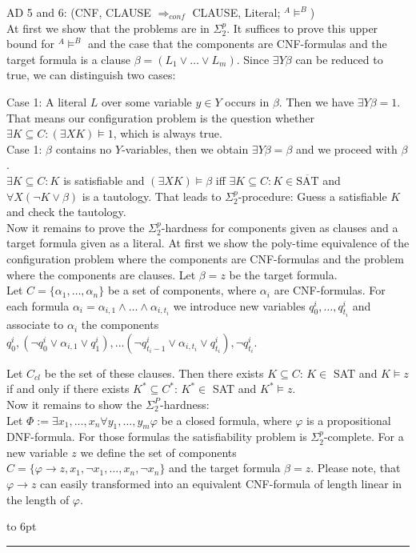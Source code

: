 \documentclass[12pt]{article}
\newcommand{\AMB}{\mbox{$^A$\hspace{-0.5mm}$\models^B$}}
\newenvironment{proof}{\parindent=0pt{\bf Proof: }}{
   \hspace*{\fill}\hbox to 6pt{\leaders\hrule width 6pt height 6pt\hfill}\par}
\begin{document}
\begin{proof}
AD 5 and 6: (CNF, CLAUSE $\Longrightarrow_{conf}$ CLAUSE, Literal; \AMB)\\
At first we show that the problems are in $\Sigma^p_2$. It suffices to prove this upper bound for \AMB
and the case that the components are CNF-formulas and the target formula is a clause
$\beta =(L_1 \vee \ldots \vee L_m)$. Since $\exists Y \beta$ can be reduced to true, we can distinguish two cases:

Case 1: A literal $L$ over some variable $y \in Y$ occurs in $\beta$. Then we have $\exists Y \beta = 1$. That means our configuration problem is the question whether
$\exists K \subseteq C: (\exists X K) \models 1$, which is always true.\\

Case 1: $\beta$ contains no $Y$-variables, then we obtain $\exists Y \beta = \beta$ and we proceed with $\beta$.\\
$\exists K \subseteq C: K$ is satisfiable and $(\exists X K) \models \beta$ iff
$\exists K \subseteq C: K \in \overline{\mbox{SAT}}$ and $\forall X (\neg K \vee \beta)$ is a tautology.
That leads to $\Sigma^p_2$-procedure: Guess a satisfiable $K$ and check the tautology.\\

Now it remains to prove the $\Sigma^p_2$-hardness for components given  as clauses and a target formula given as a literal.
At first we show the poly-time equivalence of the configuration problem where the components are CNF-formulas and
the problem where the components are clauses.
Let $\beta=z$ be the target formula.\\
Let $C=\{\alpha_1, \ldots, \alpha_n\}$ be a set of components, where $\alpha_i$ are CNF-formulas.
For each formula $\alpha_i= \alpha_{i,1} \wedge \ldots \wedge \alpha_{i,t_i}$  we introduce new variables $q^i_0, \ldots, q^i_{t_i}$ and associate to $\alpha_i$ the components $q^i_0, (\neg q^i_0 \vee \alpha_{i,1} \vee q^i_1), \ldots
(\neg q^i_{t_i-1} \vee \alpha_{i,t_i} \vee q^i_{t_i}), \neg q^i_{t_i}$.

Let $C_{cl}$ be the set of these clauses. Then there exists $K \subseteq C$: $K \in$ SAT and $K \models z$ if and only if
there exists $K^* \subseteq C^*$: $K^* \in$ SAT and $K^* \models z$.\\

Now it remains to show the $\Sigma_2^P$-hardness:\\
Let $\Phi:= \exists x_1, \ldots, x_n \forall y_1, \ldots, y_m \varphi$ be a closed formula, where
$\varphi$ is a propositional DNF-formula. For those formulas the satisfiability problem is $\Sigma^p_2$-complete.
For a new variable $z$ we define the set of components\\
$C= \{ \varphi \rightarrow z, x_1, \neg x_1, \ldots, x_n, \neg x_n\}$ and the target formula $\beta=z$. Please note, that $\varphi \rightarrow z$ can easily transformed into an equivalent CNF-formula of length linear in the length of
$\varphi$.


\end{proof}
\end{document}

